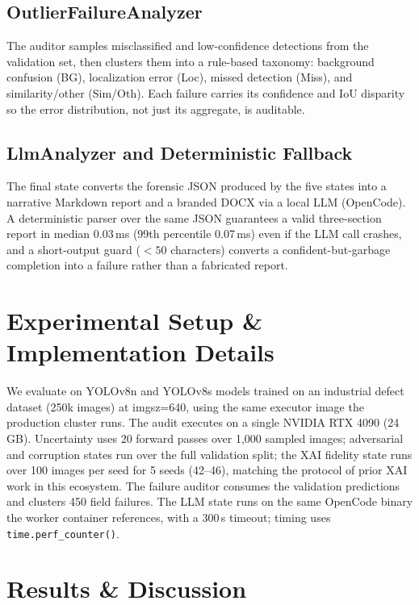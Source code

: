 \documentclass[10pt,twocolumn,letterpaper]{article}
\begin{document}
\subsection{OutlierFailureAnalyzer}
The auditor samples misclassified and low-confidence detections from the validation set, then clusters them into a rule-based taxonomy: background confusion (BG), localization error (Loc), missed detection (Miss), and similarity/other (Sim/Oth). Each failure carries its confidence and IoU disparity so the error distribution, not just its aggregate, is auditable.

\subsection{LlmAnalyzer and Deterministic Fallback}
The final state converts the forensic JSON produced by the five states into a narrative Markdown report and a branded DOCX via a local LLM (OpenCode). A deterministic parser over the same JSON guarantees a valid three-section report in median 0.03\,ms (99th percentile 0.07\,ms) even if the LLM call crashes, and a short-output guard ($<50$ characters) converts a confident-but-garbage completion into a failure rather than a fabricated report.


\section{Experimental Setup \& Implementation Details}
\label{sec:exp}
We evaluate on YOLOv8n and YOLOv8s models trained on an industrial defect dataset (250k images) at imgsz=640, using the same executor image the production cluster runs. The audit executes on a single NVIDIA RTX 4090 (24 GB). Uncertainty uses 20 forward passes over 1,000 sampled images; adversarial and corruption states run over the full validation split; the XAI fidelity state runs over 100 images per seed for 5 seeds (42--46), matching the protocol of prior XAI work in this ecosystem. The failure auditor consumes the validation predictions and clusters 450 field failures. The LLM state runs on the same OpenCode binary the worker container references, with a 300\,s timeout; timing uses \texttt{time.perf\_counter()}.

\section{Results \& Discussion}
\label{sec:results}
\end{document}
